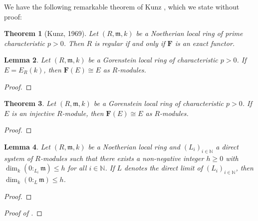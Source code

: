 \documentclass[10pt]{article}
\theoremstyle{thmstyle}
\newtheorem{theorem}{Theorem}[section]
\newtheorem{lemma}[theorem]{Lemma}
\theoremstyle{defstyle}
\newcommand{\N}{\mathbb{N}}
\newcommand{\frakm}{\mathfrak{m}} %
\renewcommand{\le}{\leqslant}
\renewcommand{\ge}{\geqslant}
\newcommand{\bfF}{\mathbf{F}} %
\begin{document}
We have the following remarkable theorem of Kunz \cite{kunz-regular-local}, which we state without proof:
\begin{theorem}[Kunz, 1969]
	Let $(R,\frakm, k)$ be a Noetherian local ring of prime characteristic $p > 0$. Then $R$ is regular if and only if $\bfF$ is an exact functor.
\end{theorem}

\begin{lemma}
	Let $(R,\frakm,k)$ be a Gorenstein local ring of characteristic $p > 0$. If $E = E_R(k)$, then $\bfF(E)\cong E$ as $R$-modules.
\end{lemma}
\begin{proof}
	
\end{proof}

\begin{theorem}
	Let $(R,\frakm,k)$ be a Gorenstein local ring of characteristic $p > 0$. If $E$ is an injective $R$-module, then $\bfF(E)\cong E$ as $R$-modules.
\end{theorem}
\begin{proof}
\end{proof}

\begin{lemma}
	Let $(R,\frakm,k)$ be a Noetherian local ring and $(L_i)_{i\in\N}$ a direct system of $R$-modules such that there exists a non-negative integer $h\ge 0$ with $\dim_k(0 :_{L_i}\frakm)\le h$ for all $i\in\N$. If $L$ denotes the direct limit of $(L_i)_{i\in\N}$, then $\dim_k(0 :_L\frakm)\le h$.
\end{lemma}
\begin{proof}
\end{proof}

\begin{proof}[Proof of ]
\end{proof}


\end{document}
